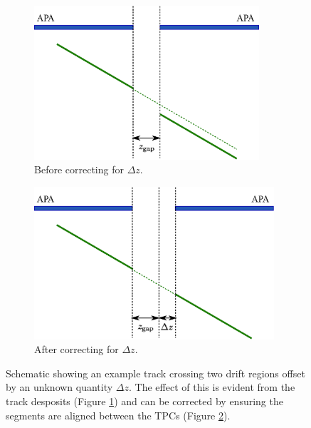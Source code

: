 \begin{figure}
  \centering
  \begin{subfigure}[t]{0.48\linewidth}
    \centering
    \includegraphics[width=0.92\textwidth]{apa_gap_zoffset.eps}
    \caption{Before correcting for $\Delta z$.}
    \label{fig:APAGapZOffsetUncorrected}
  \end{subfigure}
  \hfill
  \begin{subfigure}[t]{0.48\linewidth}
    \centering
    \includegraphics[width=0.98\textwidth]{apa_gap_zoffset_fix.eps}
    \caption{After correcting for $\Delta z$.}
    \label{fig:APAGapZOffsetCorrected}
  \end{subfigure}
  \caption{Schematic showing an example track crossing two drift regions offset by an unknown quantity $\Delta z$.  The effect of this is evident from the track desposits (Figure \ref{fig:APAGapZOffsetUncorrected}) and can be corrected by ensuring the segments are aligned between the TPCs (Figure \ref{fig:APAGapZOffsetCorrected}).}
  \label{fig:APAGapZOffset}
\end{figure}

